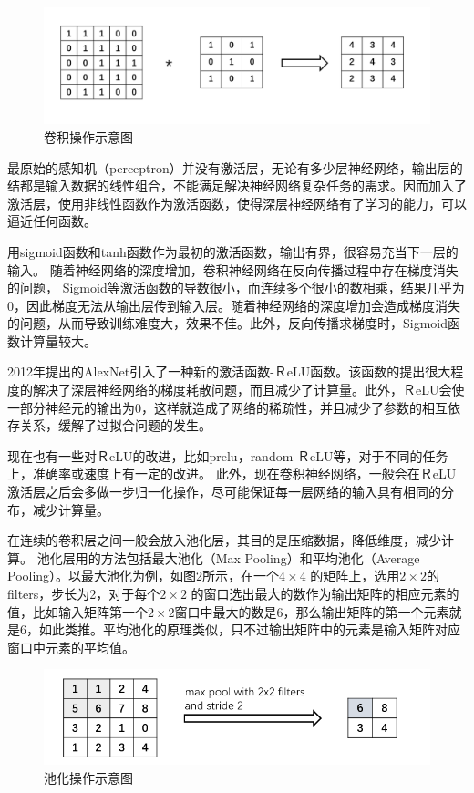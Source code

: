 \begin{figure}[h]
\begin{center}
\includegraphics[width=1\textwidth]{figures/CNN2.png}
\end{center}
\vspace{-5mm}
\caption{卷积操作示意图}
\label{fig2.4}
\end{figure}

最原始的感知机（perceptron）并没有激活层，无论有多少层神经网络，输出层的结都是输入数据的线性组合，不能满足解决神经网络复杂任务的需求。因而加入了激活层，使用非线性函数作为激活函数，使得深层神经网络有了学习的能力，可以逼近任何函数。

用sigmoid函数和tanh函数作为最初的激活函数，输出有界，很容易充当下一层的输入。
随着神经网络的深度增加，卷积神经网络在反向传播过程中存在梯度消失的问题，
Sigmoid等激活函数的导数很小，而连续多个很小的数相乘，结果几乎为0，因此梯度无法从输出层传到输入层。随着神经网络的深度增加会造成梯度消失的问题，从而导致训练难度大，效果不佳。此外，反向传播求梯度时，Sigmoid函数计算量较大。

2012年提出的AlexNet引入了一种新的激活函数-ＲeLU函数。该函数的提出很大程度的解决了深层神经网络的梯度耗散问题，而且减少了计算量。此外，ＲeLU会使一部分神经元的输出为0，这样就造成了网络的稀疏性，并且减少了参数的相互依存关系，缓解了过拟合问题的发生。

现在也有一些对ＲeLU的改进，比如prelu，random ＲeLU等，对于不同的任务上，准确率或速度上有一定的改进。
此外，现在卷积神经网络，一般会在ＲeLU激活层之后会多做一步归一化操作，尽可能保证每一层网络的输入具有相同的分布，减少计算量。

在连续的卷积层之间一般会放入池化层，其目的是压缩数据，降低维度，减少计算。
池化层用的方法包括最大池化（Max Pooling）和平均池化（Average Pooling）。以最大池化为例，如图\ref{fig2.5}所示，在一个$4\times4$ 的矩阵上，选用$2\times2$的filters，步长为2，对于每个$2\times 2$ 的窗口选出最大的数作为输出矩阵的相应元素的值，比如输入矩阵第一个$2\times 2$窗口中最大的数是6，那么输出矩阵的第一个元素就是6，如此类推。平均池化的原理类似，只不过输出矩阵中的元素是输入矩阵对应窗口中元素的平均值。
\begin{figure}[h]
\begin{center}
\includegraphics[width=1\textwidth]{figures/CNN3.png}
\end{center}
\vspace{-5mm}
\caption{池化操作示意图}
\label{fig2.5}
\end{figure}


